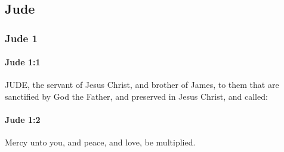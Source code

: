 \subsection{Jude}
	\label{JUDE}

	\subsubsection{Jude 1} %
		\label{JUDE-1}
		
		\paragraph{Jude 1:1} %
			\label{JUDE-1-1}

			JUDE, the servant of Jesus Christ, and brother of James, to them that are sanctified by God the Father, and preserved in Jesus Christ, and called:

			\begin{framed}
			\scriptsize
				\begin{compactdesc}
					\item[SBLG] 
				\end{compactdesc}
			\end{framed}

		\paragraph{Jude 1:2} %
			\label{JUDE-1-2}

			Mercy unto you, and peace, and love, be multiplied.

